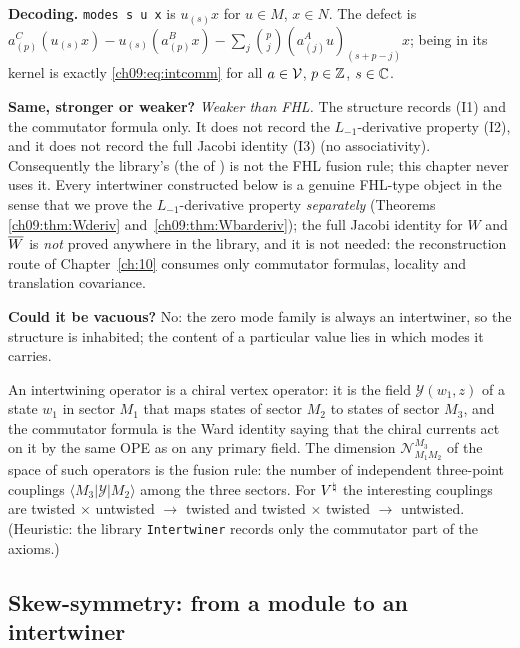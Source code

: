 \begin{dictionary}
\textbf{Decoding.} \texttt{modes s u x} is $u_{(s)}x$ for $u\in M$, $x\in N$. The defect is
$a^C_{(p)}(u_{(s)}x)-u_{(s)}(a^B_{(p)}x)-\sum_j\binom{p}{j}(a^A_{(j)}u)_{(s+p-j)}x$; being in its
kernel is exactly \eqref{ch09:eq:intcomm} for all $a\in\mathcal{V}$, $p\in{\mathbb{Z}}$, $s\in{\mathbb{C}}$.

\textbf{Same, stronger or weaker?} \emph{Weaker than FHL.} The structure records (I1) and the
commutator formula only. It does not record the $L_{-1}$-derivative property (I2), and it does not
record the full Jacobi identity (I3) (no associativity). Consequently the library's
 (the  of ) is not the FHL fusion rule;
this chapter never uses it. Every intertwiner constructed below is a genuine FHL-type object in
the sense that we prove the $L_{-1}$-derivative property \emph{separately} (Theorems
\ref{ch09:thm:Wderiv} and~\ref{ch09:thm:Wbarderiv}); the full Jacobi identity for $W$ and
$\overline{W}$ is \emph{not} proved anywhere in the library, and it is not needed: the
reconstruction route of Chapter~\ref{ch:10} consumes only commutator formulas, locality and
translation covariance.

\textbf{Could it be vacuous?} No: the zero mode family is always an intertwiner, so the structure
is inhabited; the content of a particular  value lies in which modes it carries.
\end{dictionary}

\begin{physics}
An intertwining operator is a chiral vertex operator: it is the field $\mathcal Y(w_1,z)$ of a state $w_1$ in sector $M_1$ that maps states of sector $M_2$ to states of sector $M_3$, and the commutator formula is the Ward identity saying that the chiral currents act on it by the same OPE as on any primary field. The dimension $\mathcal N^{M_3}_{M_1M_2}$ of the space of such operators is the fusion rule: the number of independent three-point couplings $\langle M_3|\mathcal Y|M_2\rangle$ among the three sectors. For ${V^{\natural}}$ the interesting couplings are twisted $\times$ untwisted $\to$ twisted and twisted $\times$ twisted $\to$ untwisted. (Heuristic: the library \texttt{Intertwiner} records only the commutator part of the axioms.)
\end{physics}

\subsection{Skew-symmetry: from a module to an intertwiner}

